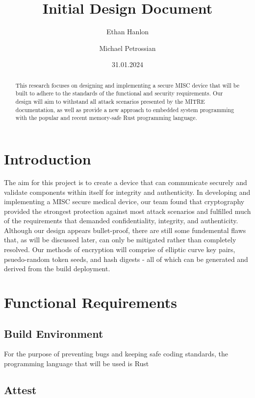 \documentclass{prace}
\title{Initial Design Document}
\date{31.01.2024}
\author[1]{Ethan Hanlon}
\author[1]{Michael Petrossian}
\affiliation{San Francisco State University, 1600 Holloway Avenue, San Francisco, CA 94132, USA}
\begin{document}
\maketitle

\begin{abstract}
This research focuses on designing and implementing a secure MISC device that will be built to adhere to the standards of the functional and security requirements. Our design will 
aim to withstand all attack scenarios presented by the MITRE documentation, as well as provide a new approach to embedded system programming with the popular and recent memory-safe Rust programming language. 
\end{abstract}

\section{Introduction}

The aim for this project is to create a device that can communicate securely and validate components within itself for integrity and authenticity.
In developing and implementing a MISC secure medical device, our team found that cryptography
provided the strongest protection against most attack scenarios and fulfilled much of the requirements
that demanded confidentiality, integrity, and authenticity. Although our design appears bullet-proof, there are still
some fundemental flaws that, as will be discussed later, can only be mitigated rather than completely resolved. Our methods of encryption will comprise of elliptic curve key pairs, 
psuedo-random token seeds, and hash digests - all of which can be generated and derived from the build deployment.

\section{Functional Requirements}

\subsection{Build Environment}
For the purpose of preventing bugs and keeping safe coding standards, the programming language that will be used is Rust

\subsection{Attest}
\end{document}

